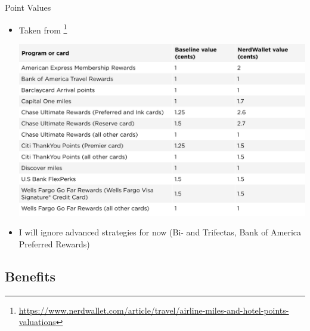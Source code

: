 \begin{frame}{Point Values}
    \begin{itemize}
        \item Taken from \citet{nerdwallet:2024}\footnote{\url{https://www.nerdwallet.com/article/travel/airline-miles-and-hotel-points-valuations}}
        \begin{center}
            \includegraphics[width=.8\textwidth]{../Misc/PointValuesNerdwallet.png}
        \end{center}
        \item I will ignore advanced strategies for now (Bi- and Trifectas, Bank of America Preferred Rewards)
    \end{itemize}
\end{frame}


\subsection{Benefits}

